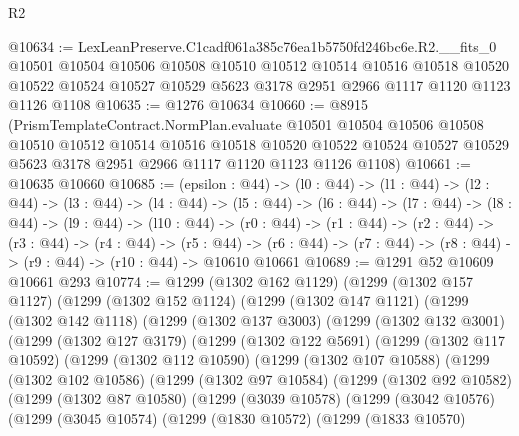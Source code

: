 \begin{lexlean}{R2}
\begin{coremodule}
@10634 := LexLeanPreserve.C1cadf061a385c76ea1b5750fd246bc6e.R2.__fits_0
    @10501
    @10504
    @10506
    @10508
    @10510
    @10512
    @10514
    @10516
    @10518
    @10520
    @10522
    @10524
    @10527
    @10529
    @5623
    @3178
    @2951
    @2966
    @1117
    @1120
    @1123
    @1126
    @1108
@10635 := @1276 @10634
@10660 := @8915
    (PrismTemplateContract.NormPlan.evaluate
      @10501
      @10504
      @10506
      @10508
      @10510
      @10512
      @10514
      @10516
      @10518
      @10520
      @10522
      @10524
      @10527
      @10529
      @5623
      @3178
      @2951
      @2966
      @1117
      @1120
      @1123
      @1126
      @1108)
@10661 := @10635 @10660
@10685 := (epsilon : @44) ->
  (l0 : @44) ->
  (l1 : @44) ->
  (l2 : @44) ->
  (l3 : @44) ->
  (l4 : @44) ->
  (l5 : @44) ->
  (l6 : @44) ->
  (l7 : @44) ->
  (l8 : @44) ->
  (l9 : @44) ->
  (l10 : @44) ->
  (r0 : @44) ->
  (r1 : @44) ->
  (r2 : @44) ->
  (r3 : @44) ->
  (r4 : @44) ->
  (r5 : @44) -> (r6 : @44) -> (r7 : @44) -> (r8 : @44) -> (r9 : @44) -> (r10 : @44) -> @10610 @10661
@10689 := @1291 @52 @10609 @10661 @293
@10774 := @1299
    (@1302 @162 @1129)
    (@1299
      (@1302 @157 @1127)
      (@1299
        (@1302 @152 @1124)
        (@1299
          (@1302 @147 @1121)
          (@1299
            (@1302 @142 @1118)
            (@1299
              (@1302 @137 @3003)
              (@1299
                (@1302 @132 @3001)
                (@1299
                  (@1302 @127 @3179)
                  (@1299
                    (@1302 @122 @5691)
                    (@1299
                      (@1302 @117 @10592)
                      (@1299
                        (@1302 @112 @10590)
                        (@1299
                          (@1302 @107 @10588)
                          (@1299
                            (@1302 @102 @10586)
                            (@1299
                              (@1302 @97 @10584)
                              (@1299
                                (@1302 @92 @10582)
                                (@1299
                                  (@1302 @87 @10580)
                                  (@1299
                                    (@3039 @10578)
                                    (@1299
                                      (@3042 @10576)
                                      (@1299
                                        (@3045 @10574)
                                        (@1299
                                          (@1830 @10572)
                                          (@1299
                                            (@1833 @10570)

\end{coremodule}
\end{lexlean}
